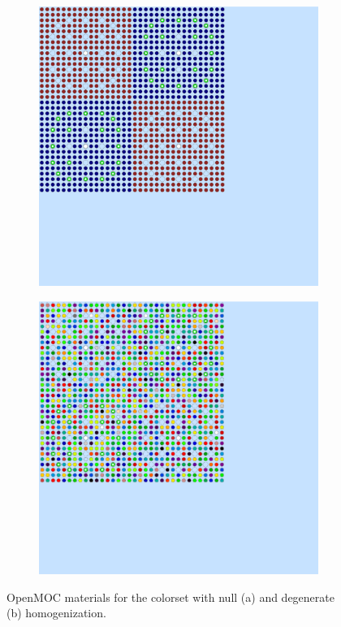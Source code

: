 \begin{figure}[h!]
\centering
\begin{subfigure}{0.42\textwidth}
  \centering
  \includegraphics[width=0.8\linewidth]{figures/reflector/geometry}
  \caption{}
  \label{fig:null-reflector}
\end{subfigure}
\begin{subfigure}{0.42\textwidth}
  \centering
  \includegraphics[width=0.8\linewidth]{figures/reflector/degenerate-materials}
  \caption{}
  \label{fig:degenerate-reflector}
\end{subfigure}
\caption{OpenMOC materials for the colorset with null (a) and degenerate (b) homogenization.}
\label{fig:benchmarks-colorset}
\end{figure}

